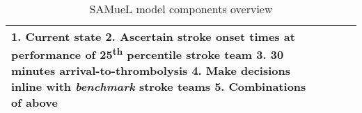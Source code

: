 \begin{landscape}
{\begin{table}
\begin{tabular}{|p{5cm}|p{5cm}|p{6cm}|p{6cm}|}
1. Current state\newline\vspace{3pt}
2. Ascertain stroke onset times at performance of 25\textsuperscript{th} percentile stroke team\newline\vspace{3pt}
3. 30 minutes arrival-to-thrombolysis\newline\vspace{3pt}
4. Make decisions inline with \textit{benchmark} stroke teams\newline\vspace{3pt}
5. Combinations of above\newline\vspace{3pt}
\\

\hline


\end{tabular}
\caption{SAMueL model components overview}
\label{tab:example}
\end{table}
}
\end{landscape}